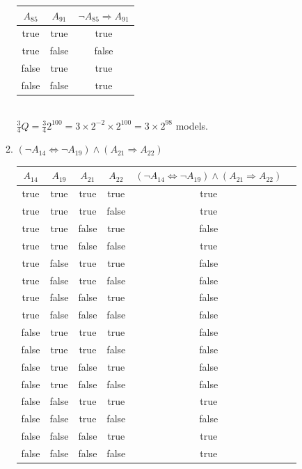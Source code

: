 \documentclass[paper=a4, fontsize=11pt]{scrartcl} %
\numberwithin{equation}{section} %
\numberwithin{figure}{section} %
\numberwithin{table}{section} %
\begin{document}
\begin{enumerate}
\begin{enumerate}
		\begin{tabular}{c c c}
			\hline
			$A_{85}$ & $A_{91}$ & $\neg A_{85} \Rightarrow A_{91}$\\
			\hline
			true 	& true 		&true\\
			true 	& false 	&false\\
			false 	& true  	&true\\
			false 	& false 	&true\\
		\end{tabular}
		\\

		$\frac{3}{4}Q = \frac{3}{4}2^{100} = 3 \times 2^{-2} \times 2^{100} = 3 \times 2^{98}$ models.
		\\
		
		\item %
		$(\neg A_{14} \Leftrightarrow \neg A_{19}) \wedge (A_{21} \Rightarrow A_{22})$

		\begin{tabular}{c c c c c c}
			\hline
			$A_{14}$ & $A_{19}$ & $A_{21}$ & $A_{22}$ & $(\neg A_{14} \Leftrightarrow \neg A_{19}) \wedge (A_{21} \Rightarrow A_{22})$ \\
			\hline
			true 	& true 		& true 		& true		& true\\
			true 	& true 		& true 		& false		& true\\
			true 	& true 		& false 	& true		& false\\
			true 	& true 		& false 	& false		& true\\
			true 	& false 	& true 		& true		& false\\
			true 	& false 	& true 		& false		& false\\
			true 	& false 	& false 	& true		& false\\
			true 	& false 	& false 	& false		& false\\
			false 	& true 		& true 		& true		& false\\
			false 	& true 		& true 		& false		& false\\
			false 	& true 		& false 	& true		& false\\
			false 	& true 		& false 	& false		& false\\
			false 	& false 	& true 		& true		& true\\
			false 	& false 	& true 		& false		& false\\
			false 	& false 	& false 	& true		& true\\
			false 	& false 	& false 	& false		& true\\
		\end{tabular}
		\\


\end{enumerate}
\end{enumerate}
\end{document}
